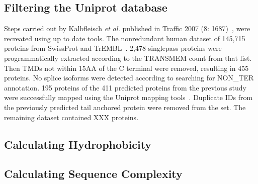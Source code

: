 
\subsection{Filtering the Uniprot database}
Steps carried out by Kalbfleisch \textit{et al.} published in Traffic 2007 (8: 1687)~\cite{Kalbfleisch2007}, were recreated using up to date tools.
The non\-redundant human dataset of 145,715 proteins from SwissProt and TrEMBL~\cite{TheUniProtConsortium2014}.
2,478 singlepass proteins were programmatically extracted according to the TRANSMEM count from that list.
Then TMDs not within 15AA of the C terminal were removed, resulting in 455 proteins.
No splice isoforms were detected according to searching for NON\_TER annotation.
195 proteins of the 411 predicted proteins from the previous study were successfully mapped using the Uniprot mapping tools~\cite{TheUniProtConsortium2014}.
Duplicate IDs from the previously predicted tail anchored protein were removed from the set.
The remaining dataset contained XXX proteins.

\subsection{Calculating Hydrophobicity}

\subsection{Calculating Sequence Complexity}

